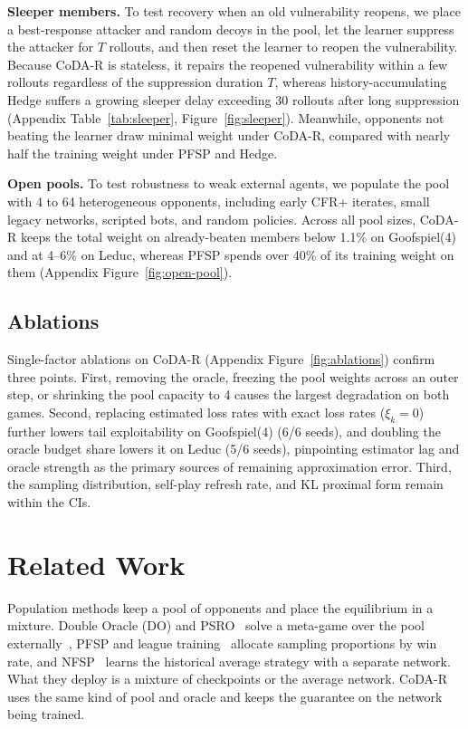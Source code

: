 \documentclass{article}
\theoremstyle{plain}
\theoremstyle{remark}
\newcommand{\codar}{CoDA-R}
\begin{document}
\textbf{Sleeper members.} To test recovery when an old vulnerability reopens, we place a best-response attacker and random decoys in the pool, let the learner suppress the attacker for $T$ rollouts, and then reset the learner to reopen the vulnerability. Because \codar{} is stateless, it repairs the reopened vulnerability within a few rollouts regardless of the suppression duration $T$, whereas history-accumulating Hedge suffers a growing sleeper delay exceeding 30 rollouts after long suppression (Appendix Table~\ref{tab:sleeper}, Figure~\ref{fig:sleeper}). Meanwhile, opponents not beating the learner draw minimal weight under \codar{}, compared with nearly half the training weight under PFSP and Hedge.

\textbf{Open pools.} To test robustness to weak external agents, we populate the pool with 4 to 64 heterogeneous opponents, including early CFR+ iterates, small legacy networks, scripted bots, and random policies. Across all pool sizes, \codar{} keeps the total weight on already-beaten members below 1.1\% on Goofspiel(4) and at 4--6\% on Leduc, whereas PFSP spends over 40\% of its training weight on them (Appendix Figure~\ref{fig:open-pool}).

\subsection{Ablations}
\label{sec:exp-abl}

Single-factor ablations on \codar{} (Appendix Figure~\ref{fig:ablations}) confirm three points. First, removing the oracle, freezing the pool weights across an outer step, or shrinking the pool capacity to 4 causes the largest degradation on both games. Second, replacing estimated loss rates with exact loss rates ($\xi_k=0$) further lowers tail exploitability on Goofspiel(4) (6/6 seeds), and doubling the oracle budget share lowers it on Leduc (5/6 seeds), pinpointing estimator lag and oracle strength as the primary sources of remaining approximation error. Third, the sampling distribution, self-play refresh rate, and KL proximal form remain within the CIs.

\section{Related Work}
\label{sec:related}

Population methods keep a pool of opponents and place the equilibrium in a mixture. Double Oracle (DO) and PSRO~\citep{mcmahan2003doubleoracle,lanctot2017psro,muller2020generalized,mcaleer2020pipeline} solve a meta-game over the pool externally~\citep{wellman2006egta}, PFSP and league training~\citep{vinyals2019alphastar} allocate sampling proportions by win rate, and NFSP~\citep{heinrich2015fsp,heinrich2016nfsp} learns the historical average strategy with a separate network. What they deploy is a mixture of checkpoints or the average network. \codar{} uses the same kind of pool and oracle and keeps the guarantee on the network being trained.
\end{document}

